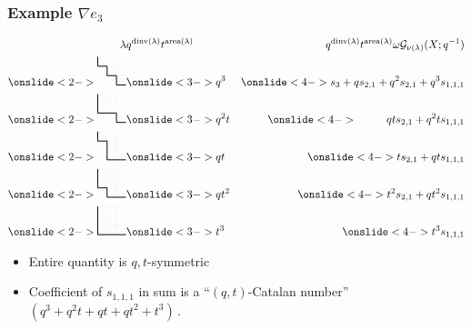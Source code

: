 \documentclass[dvipsnames]{beamer}
\newcommand{\Gcal}{{\mathcal G}}
\DeclareMathOperator{\dinv}{dinv}
\DeclareMathOperator{\area}{area}
\theoremstyle{definition}
\newcounter{c}
\begin{document}
\begin{frame}
  \frametitle{Example \(\nabla e_3\)}
  \vspace{-2em}
  \begin{eqnarray*}
    \lambda
    & q^{\dinv(\lambda)}t^{\area(\lambda)}
    & q^{\dinv(\lambda)}t^{\area(\lambda)}\omega \Gcal_{\nu(\lambda)}(X;q^{-1})\\
      \onslide<2->{\begin{tikzpicture}[xscale = 0.3,yscale = 0.3]
      \draw[step=1cm,gray!20,very thin] (0,0) grid (3,3);
      \draw[step=1cm,gray!20,very thin] (0,3)--(3,0); \draw[thick]
      (0,3)--(0,2)--(1,2)--(1,1)--(2,1)--(2,0)--(3,0);
    \end{tikzpicture}}
    & \onslide<3->{q^3}
    & \onslide<4->{s_3+qs_{2,1}+q^2s_{2,1}+q^3s_{1,1,1}}\\
    \onslide<2->
    {
    \begin{tikzpicture}[xscale = 0.3,yscale = 0.3]
      \draw[step=1cm,gray!20,very thin] (0,0) grid (3,3);
      \draw[step=1cm,gray!20,very thin] (0,3)--(3,0); \draw[thick]
      (0,3)--(0,1)--(2,1)--(2,0)--(3,0);
    \end{tikzpicture}
    }
    & \onslide<3->{q^2t}
    & \onslide<4->{\phantom{ts_{2,1}+}qts_{2,1}+q^2ts_{1,1,1}}  \\
    \onslide<2->
    {
    \begin{tikzpicture}[xscale = 0.3,yscale = 0.3]
      \draw[step=1cm,gray!20,very thin] (0,0) grid (3,3);
      \draw[step=1cm,gray!20,very thin] (0,3)--(3,0); \draw[thick]
      (0,3)--(0,2)--(1,2)--(1,0)--(3,0);
    \end{tikzpicture}
    }
    & \onslide<3->{qt}
    & \onslide<4->{ts_{2,1}+qts_{1,1,1}}\\
    \onslide<2->
    {
    \begin{tikzpicture}[xscale = 0.3,yscale = 0.3]
      \draw[step=1cm,gray!20,very thin] (0,0) grid (3,3);
      \draw[step=1cm,gray!20,very thin] (0,3)--(3,0); \draw[thick]
      (0,3)--(0,1)--(1,1)--(1,0)--(3,0);
    \end{tikzpicture}
    }
    &\onslide<3->{qt^2}
    &\onslide<4->{ t^2 s_{2,1}+qt^2s_{1,1,1}}\\
    \onslide<2->
    {
    \begin{tikzpicture}[xscale = 0.3,yscale = 0.3]
      \draw[step=1cm,gray!20,very thin] (0,0) grid (3,3);
      \draw[step=1cm,gray!20,very thin] (0,3)--(3,0); \draw[thick]
      (0,3)--(0,0)--(3,0);
    \end{tikzpicture}
    }
    &\onslide<3->{t^3}
    & \onslide<4->{t^3s_{1,1,1}}
  \end{eqnarray*}
  \vspace{-0.75em}
  \begin{itemize}
  \item<5-> Entire quantity is \(q,t\)-symmetric
  \item<6-> Coefficient of \(s_{1,1,1}\) in sum is a ``\((q,t)\)-Catalan
    number'' \((q^3+q^2t+qt+qt^2+t^3)\)\,.
  \end{itemize}
\end{frame}
\end{document}

